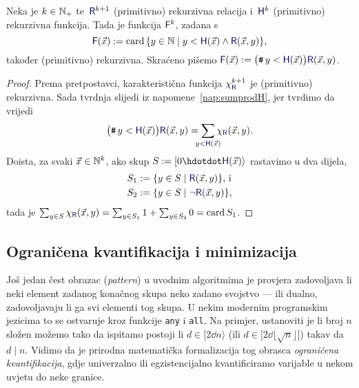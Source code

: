 \begin{lema}[{name=[ograničeno brojenje čuva (primitivnu) rekurzivnost]}]\label{lm:brojrek}
Neka je $k\in{\mathbb N}_+$ te\, $\f R^{k+1}$ (primitivno) rekurzivna relacija i\, $\f H^k$ (primitivno) rekurzivna funkcija. Tada je funkcija $\f F^k$, zadana s
\begin{equation}
    \f F(\vec x):=\card\,\{y\in\N\mid y<\f H(\vec x)\land\f R(\vec x,y)\}\text,
\end{equation}
također (primitivno) rekurzivna. Skraćeno pišemo $\f F(\vec x):=\bigl(\num y<\f H(\vec x)\bigr)\f R(\vec x,y)$.
\end{lema}
\begin{proof}
    Prema pretpostavci, karakteristična funkcija $\chi_{\f R}^{k+1}$ je (primitivno) rekurzivna. Sada tvrdnja slijedi iz napomene~\ref{nap:sumprodH}, jer tvrdimo da vrijedi
    \begin{equation}
        \bigl(\num y<\f H(\vec x)\bigr)\f R(\vec x,y)=\sum_{\mathclap{y<\f H(\vec x)}}\chi_{\f R}(\vec x,y)\text.
    \end{equation}
    Doista, za svaki $\vec x\in{\mathbb N}^k$, ako skup $S:=[0\dd \f H(\vec x)\rangle$ rastavimo u dva dijela,
    \begin{align}
        S_1&:=\{y\in S\mid\f R(\vec x,y)\}\text{, i}\\
        S_2&:=\{y\in S\mid\lnot\f R(\vec x,y)\}\text,
    \end{align}
    tada je
        $\sum_{y\in S}\chi_{\f R}(\vec x,y)=\sum_{y\in S_1}1+\sum_{y\in S_2}0=\card S_1$.
\end{proof}

\subsection{Ograničena kvantifikacija i minimizacija}

Još jedan čest obrazac (\emph{pattern}) u uvodnim algoritmima je provjera zadovoljava li neki element zadanog konačnog skupa neko zadano svojstvo --- ili dualno, zadovoljavaju li ga svi elementi tog skupa. U nekim modernim programskim jezicima to se ostvaruje kroz funkcije \texttt{any} i \texttt{all}. Na primjer, ustanoviti je li broj $n$ složen možemo tako da ispitamo postoji li $d\in[2\dd n\rangle$ (ili $d\in\bigl[2\dd \lfloor\!\sqrt{n}\rfloor\bigr]$) takav da $d\mathrel|n$. Vidimo da je prirodna matematička formalizacija tog obrasca \emph{ograničena kvantifikacija}, gdje univerzalno ili egzistencijalno kvantificiramo varijable u nekom uvjetu do neke granice.

